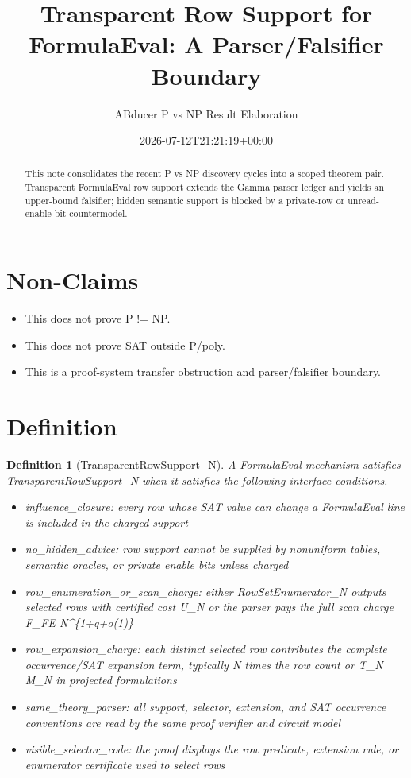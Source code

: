 \documentclass[11pt]{article}
\title{Transparent Row Support for FormulaEval: A Parser/Falsifier Boundary}
\author{ABducer P vs NP Result Elaboration}
\date{2026-07-12T21:21:19+00:00}
\newtheorem{definition}{Definition}
\begin{document}
\maketitle
\begin{abstract}
This note consolidates the recent P vs NP discovery cycles into a scoped theorem pair. Transparent FormulaEval row support extends the Gamma parser ledger and yields an upper-bound falsifier; hidden semantic support is blocked by a private-row or unread-enable-bit countermodel.
\end{abstract}

\section{Non-Claims}
\begin{itemize}
\item This does not prove P != NP.
\item This does not prove SAT outside P/poly.
\item This is a proof-system transfer obstruction and parser/falsifier boundary.
\end{itemize}

\section{Definition}
\begin{definition}[TransparentRowSupport\_N]
A FormulaEval mechanism satisfies TransparentRowSupport\_N when it satisfies the following interface conditions.
\begin{itemize}
\item influence\_closure: every row whose SAT value can change a FormulaEval line is included in the charged support
\item no\_hidden\_advice: row support cannot be supplied by nonuniform tables, semantic oracles, or private enable bits unless charged
\item row\_enumeration\_or\_scan\_charge: either RowSetEnumerator\_N outputs selected rows with certified cost U\_N or the parser pays the full scan charge F\_FE N\textasciicircum{}\{1+q+o(1)\}
\item row\_expansion\_charge: each distinct selected row contributes the complete occurrence/SAT expansion term, typically N times the row count or T\_N M\_N in projected formulations
\item same\_theory\_parser: all support, selector, extension, and SAT occurrence conventions are read by the same proof verifier and circuit model
\item visible\_selector\_code: the proof displays the row predicate, extension rule, or enumerator certificate used to select rows
\end{itemize}
\end{definition}
\end{document}
